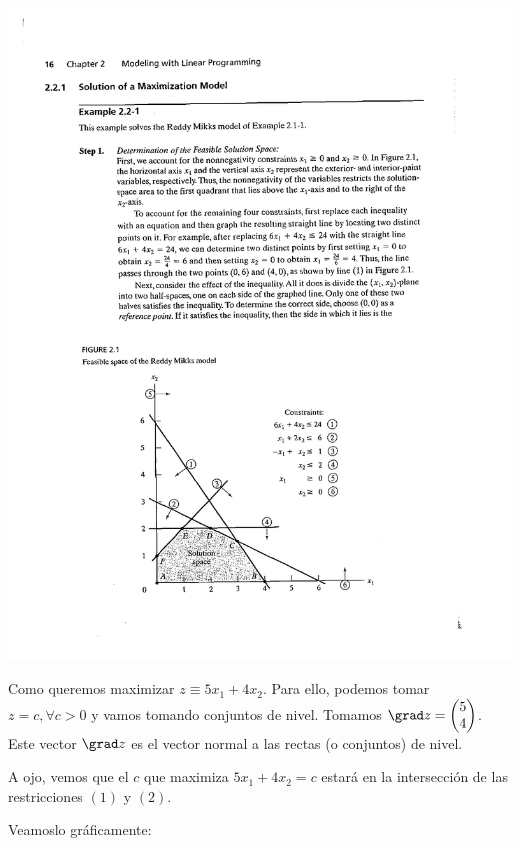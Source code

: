 \documentclass[palatino,nochap]{apuntes}
\begin{document}
\begin{example}
\begin{center}
\includegraphics[scale=0.8]{tex/berrendero/tema1/_GraficoEjemplo1}
\end{center}


Como queremos maximizar $z\equiv 5x_1+4x_2$. Para ello, podemos tomar $z = c, ∀c>0$ y vamos tomando conjuntos de nivel. 
Tomamos $\grad z = \begin{pmatrix}5\\4\end{pmatrix}$. Este vector $\grad z$ es el vector normal a las rectas (o conjuntos) de nivel.

A ojo, vemos que el $c$ que maximiza $5x_1 + 4x_2 = c$ estará en la intersección de las restricciones $(1)$ y $(2)$.

Veamoslo gráficamente:


\end{example}
\end{document}
